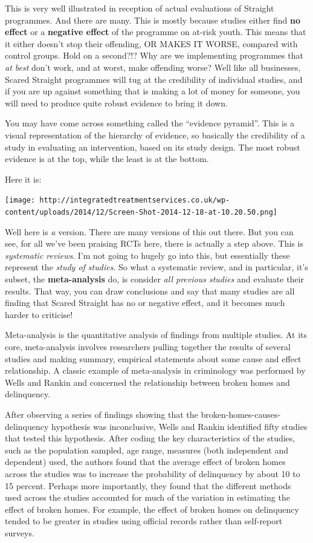 \documentclass[]{book}
\theoremstyle{definition}
\theoremstyle{definition}
\theoremstyle{definition}
\theoremstyle{remark}
\begin{document}
This is very well illustrated in reception of actual evaluations of
Straight programmes. And there are many. This is mostly because studies
either find \textbf{no effect} or a \textbf{negative effect} of the
programme on at-risk youth. This means that it either doesn't stop their
offending, OR MAKES IT WORSE, compared with control groups. Hold on a
second?!? Why are we implementing programmes that \emph{at best} don't
work, and at worst, make offending worse? Well like all businesses,
Scared Straight programmes will tug at the credibility of individual
studies, and if you are up against something that is making a lot of
money for someone, you will need to produce quite robust evidence to
bring it down.

You may have come across something called the ``evidence pyramid''. This
is a visual representation of the hierarchy of evidence, so basically
the credibility of a study in evaluating an intervention, based on its
study design. The most robust evidence is at the top, while the least is
at the bottom.

Here it is:

\texttt{[image: http://integratedtreatmentservices.co.uk/wp-content/uploads/2014/12/Screen-Shot-2014-12-18-at-10.20.50.png]}

Well here is \emph{a} version. There are many versions of this out
there. But you can see, for all we've been praising RCTs here, there is
actually a step above. This is \emph{systematic reviews}. I'm not going
to hugely go into this, but essentially these represent the \emph{study
of studies}. So what a systematic review, and in particular, it's
subset, the \textbf{meta-analysis} do, is consider \emph{all previous
studies} and evaluate their results. That way, you can draw conclusions
and say that many studies are all finding that Scared Straight has no or
negative effect, and it becomes much harder to criticise!

Meta-analysis is the quantitative analysis of findings from multiple
studies. At its core, meta-analysis involves researchers pulling
together the results of several studies and making summary, empirical
statements about some cause and effect relationship. A classic example
of meta-analysis in criminology was performed by Wells and Rankin and
concerned the relationship between broken homes and delinquency.

After observing a series of findings showing that the
broken-homes-causes-delinquency hypothesis was inconclusive, Wells and
Rankin identified fifty studies that tested this hypothesis. After
coding the key characteristics of the studies, such as the population
sampled, age range, measures (both independent and dependent) used, the
authors found that the average effect of broken homes across the studies
was to increase the probability of delinquency by about 10 to 15
percent. Perhaps more importantly, they found that the different methods
used across the studies accounted for much of the variation in
estimating the effect of broken homes. For example, the effect of broken
homes on delinquency tended to be greater in studies using official
records rather than self-report surveys.
\end{document}
